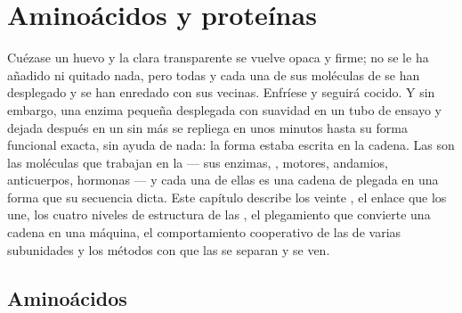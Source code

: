 \chapter{Aminoácidos y proteínas}\label{ch:b1:proteins}

Cuézase un huevo y la clara transparente se vuelve opaca y firme; no se le
ha añadido ni quitado nada, pero todas y cada una de sus moléculas de
 se han desplegado y se han enredado con sus vecinas. Enfríese y
seguirá cocido. Y sin embargo, una enzima pequeña desplegada con suavidad en
un tubo de ensayo y dejada después en un  sin más se repliega en unos
minutos hasta su forma funcional exacta, sin ayuda de nada: la forma estaba
escrita en la cadena. Las  son las moléculas que trabajan en la
 --- sus enzimas, , motores, andamios, anticuerpos, hormonas ---
y cada una de ellas es una cadena de  plegada en una forma que su
secuencia dicta. Este capítulo describe los veinte , el enlace
que los une, los cuatro niveles de estructura de las , el
plegamiento que convierte una cadena en una máquina, el comportamiento
cooperativo de las  de varias subunidades y los métodos con que las
 se separan y se ven.

\section{Aminoácidos}

